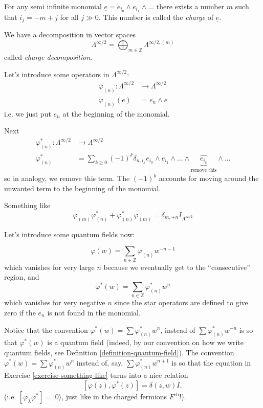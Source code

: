 For any semi infinite monomial
$\underline{e}=e_{i_0}\wedge e_{i_1}\wedge
\ldots$
there exists a number $m$ such that
$i_j=-m+j$ for all  $j \gg 0$.
This number is called the {\it charge} of
$\underline{e}$.

We have a decomposition in vector spaces
$$
\Lambda^{\infty/2}=\bigoplus_{m \in
\mathbb{Z}}\Lambda^{\infty/2,(m)}
$$
called {\it charge decomposition}.

Let's introduce some operators in
$\Lambda^{\infty/2}$:
$$
\begin{aligned}
\varphi_{(n)}: \Lambda^{\infty/2}
&\longrightarrow \Lambda^{\infty/2} \\
\varphi_{(n)}(\underline{e}) &= e_n \wedge
\underline{e}
\end{aligned}
$$
i.e. we just put $e_n$ at the beginning of
the
monomial.

Next
$$
\begin{aligned}
\varphi_{(n)}^*: \Lambda^{\infty/2}
&\longrightarrow \Lambda^{\infty/2} \\
\varphi^*_{(n)} & =\sum_{k \geq 0}(-1)^k
\delta_{n,i_k}
e_{i_0}\wedge e_{i_1}\wedge \ldots \wedge
\underbrace{\widehat{e_{i_k}}}_{\text{remove
this}}\wedge \ldots
\end{aligned}
$$
so in analogy, we remove this term.
The $(-1)^k$ accounts for moving around the
unwanted
term to the beginning of the monomial.

\begin{exercise}
\label{exercise-something-like}
Something like
$$
\varphi_{(m)}\varphi^*_{(n)}
+\varphi_{(n)}^*\varphi_{(m)}=
\delta_{m,+n}I_{\Lambda^{\infty/2}}
$$
\end{exercise}

Let's introduce some quantum fields now:

$$
\varphi(w)=\sum_{ n \in
\mathbb{Z}}\varphi_{(n)}w^{-n-1}
$$
which vanishes for very large $n$ because
we eventually get to the ``consecutive''
region,
and
$$
\varphi^*(w)=\sum_{ n \in
\mathbb{Z}}\varphi^*_{(n)}w^{n}
$$
which vanishes for very negative $n$ since
the
star operators are defined to give zero
if the $e_n$ is not found in the monomial.

Notice that the convention
$\varphi^*(w)=\sum \varphi^*_{(n)}w^n$,
instead of $\sum \varphi^*_{(n)}w^{-n}$ is so
that
$\varphi^*(w)$ is a quantum field
(indeed, by our convention on how we write
quantum fields,
see Definition
\ref{definition-quantum-field}).
The convention $\varphi^*(w)=\sum
\varphi^*_{(n)}w^n$
instead of, say, $\sum \varphi_{(n)}^*
w^{n+1}$
is so that the equation in
Exercise \ref{exercise-something-like}
turns into a nice relation
$$
[\varphi(z),\varphi^*(z)]=\delta(z,w)I,
$$
(i.e. $[\varphi_\lambda \varphi^*
]=|0\rangle$, just like in the
charged fermions $F^{\text{ch}}$!).

